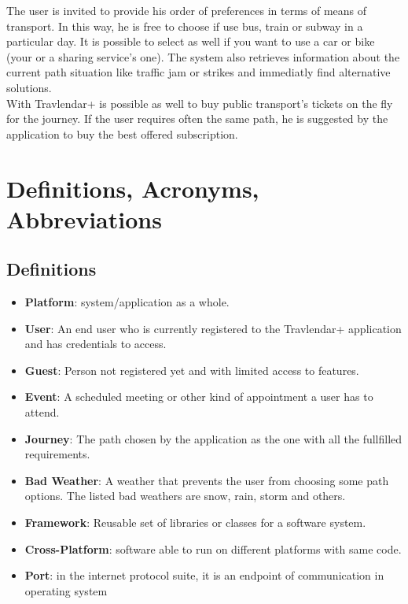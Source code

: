 \documentclass[numbers=noenddot, 12pt, a4paper, oneside]{scrbook}
\begin{document}
The user is invited to provide his order of preferences in terms of means of transport. In this way, he is free to choose if use bus, train or subway in a particular day. It is possible to select as well if you want to use a car or bike (your or a sharing service's one). The system also retrieves information about the current path situation like traffic jam or strikes and immediatly find alternative solutions.\\

With Travlendar+ is possible as well to buy public transport's tickets on the fly for the journey. If the user requires often the same path, he is suggested by the application to buy the best offered subscription.


\section{Definitions, Acronyms, Abbreviations}

\subsection*{Definitions}
\begin{itemize}
	\item \textbf{Platform}: system/application as a whole.
	\item \textbf{User}: An end user who is currently registered to the Travlendar+ application and has credentials to access.
	\item \textbf{Guest}: Person not registered yet and with limited access to features.
	\item \textbf{Event}: A scheduled meeting or other kind of appointment a user has to attend.
	\item \textbf{Journey}: The path chosen by the application as the one with all the fullfilled requirements.
	\item \textbf{Bad Weather}: A weather that prevents the user from choosing some path options. The listed bad weathers are snow, rain, storm and others.
	\item \textbf{Framework}: Reusable set of libraries or classes for a software system.
	\item \textbf{Cross-Platform}: software able to run on different platforms with same code.
	\item \textbf{Port}: in the internet protocol suite, it is an endpoint of communication in operating system
\end{itemize}
\end{document}
